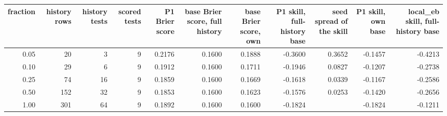 \begin{tabular}{rrrrrrrrrrr}
\toprule
fraction & history rows & history tests & scored tests & P1 Brier score & base Brier score, full history & base Brier score, own & P1 skill, full-history base & seed spread of the skill & P1 skill, own base & local\_eb skill, full-history base \\
\midrule
0.05 & 20 & 3 & 9 & 0.2176 & 0.1600 & 0.1888 & -0.3600 & 0.3652 & -0.1457 & -0.4213 \\
0.10 & 29 & 6 & 9 & 0.1912 & 0.1600 & 0.1711 & -0.1946 & 0.0827 & -0.1207 & -0.2738 \\
0.25 & 74 & 16 & 9 & 0.1859 & 0.1600 & 0.1669 & -0.1618 & 0.0339 & -0.1167 & -0.2586 \\
0.50 & 152 & 32 & 9 & 0.1853 & 0.1600 & 0.1623 & -0.1576 & 0.0253 & -0.1420 & -0.2656 \\
1.00 & 301 & 64 & 9 & 0.1892 & 0.1600 & 0.1600 & -0.1824 &  & -0.1824 & -0.1211 \\
\bottomrule
\end{tabular}
